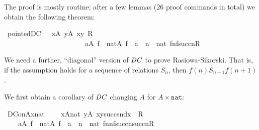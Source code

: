 The proof is mostly routine; after a few lemmas (26 proof
commands in total) we obtain the
following theorem:

\begin{isabelle}
\isamarkupfalse%
\ pointed{\isacharunderscore}DC\ \ {\isacharcolon}\ {\isachardoublequoteopen}{\isacharparenleft}{\isasymforall}x{\isasymin}A{\isachardot}\ {\isasymexists}y{\isasymin}A{\isachardot}\ {\isasymlangle}x{\isacharcomma}y{\isasymrangle}{\isasymin}\ R{\isacharparenright}\ {\isasymLongrightarrow}\isanewline
\ \ \ \ \ \ \ \ \ \ \ \ \ \ \ \ \ \ \ \ \ \ \ {\isasymforall}a{\isasymin}A{\isachardot}\ {\isacharparenleft}{\isasymexists}f\ {\isasymin}\ nat{\isasymrightarrow}A{\isachardot}\ f{\isacharbackquote}{}\ {\isacharequal}\ a\ {\isasymand}\ {\isacharparenleft}{\isasymforall}n\ {\isasymin}\ nat{\isachardot}\ {\isasymlangle}f{\isacharbackquote}n{\isacharcomma}f{\isacharbackquote}succ{\isacharparenleft}n{\isacharparenright}{\isasymrangle}{\isasymin}R{\isacharparenright}{\isacharparenright}{\isachardoublequoteclose}
\end{isabelle}

We need a further, ``diagonal'' version of $\mathit{DC}$  to prove
Rasiowa-Sikorski. That is, if the assumption holds for a sequence of
relations $S_n$,  then $f(n) \mathrel{S_{n+1}} f(n+1)$.

We first obtain a corollary of $\mathit{DC}$ changing $A$ for
$A\times\mathtt{nat}$:

\begin{isabelle}
\isamarkupfalse%
\ DC{\isacharunderscore}on{\isacharunderscore}A{\isacharunderscore}x{\isacharunderscore}nat\ {\isacharcolon}\ \isanewline
\ \ {\isachardoublequoteopen}{\isacharparenleft}{\isasymforall}x{\isasymin}A{\isasymtimes}nat{\isachardot}\ {\isasymexists}y{\isasymin}A{\isachardot}\ {\isasymlangle}x{\isacharcomma}{\isasymlangle}y{\isacharcomma}succ{\isacharparenleft}snd{\isacharparenleft}x{\isacharparenright}{\isacharparenright}{\isasymrangle}{\isasymrangle}\ {\isasymin}\ R{\isacharparenright}\ {\isasymLongrightarrow}\isanewline
\ \ \ \ {\isasymforall}a{\isasymin}A{\isachardot}\ {\isacharparenleft}{\isasymexists}f\ {\isasymin}\ nat{\isasymrightarrow}A{\isachardot}\ f{\isacharbackquote}{}\ {\isacharequal}\ a\ {\isasymand}\ {\isacharparenleft}{\isasymforall}n\ {\isasymin}\ nat{\isachardot}\ {\isasymlangle}{\isasymlangle}f{\isacharbackquote}n{\isacharcomma}n{\isasymrangle}{\isacharcomma}{\isasymlangle}f{\isacharbackquote}succ{\isacharparenleft}n{\isacharparenright}{\isacharcomma}succ{\isacharparenleft}n{\isacharparenright}{\isasymrangle}{\isasymrangle}{\isasymin}R{\isacharparenright}{\isacharparenright}{\isachardoublequoteclose}
\end{isabelle}

